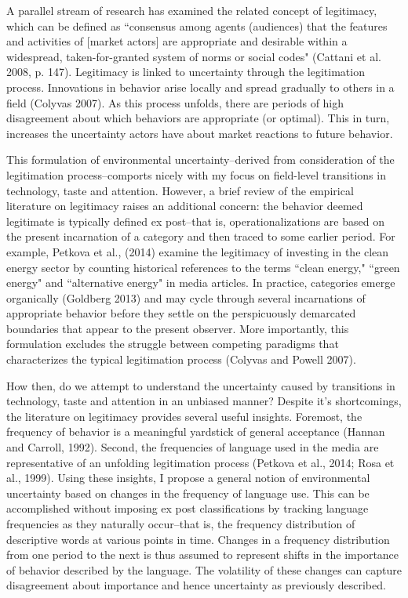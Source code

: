 A parallel stream of research has examined the related concept of legitimacy, which can be defined as ``consensus among agents (audiences) that the features and activities of [market actors] are appropriate and desirable within a widespread, taken-for-granted system of norms or social codes" (Cattani et al. 2008, p. 147). Legitimacy is linked to uncertainty through the legitimation process. Innovations in behavior arise locally and spread gradually to others in a field (Colyvas 2007). As this process unfolds, there are periods of high disagreement about which behaviors are appropriate (or optimal). This in turn, increases the uncertainty actors have about market reactions to future behavior.

This formulation of environmental uncertainty--derived from consideration of the legitimation process--comports nicely with my focus on field-level transitions in technology, taste and attention. However, a brief review of the empirical literature on legitimacy raises an additional concern: the behavior deemed legitimate is typically defined ex post--that is, operationalizations are based on the present incarnation of a category and then traced to some earlier period. For example, Petkova et al., (2014) examine the legitimacy of investing in the clean energy sector by counting historical references to the terms ``clean energy," ``green energy" and ``alternative energy" in media articles. In practice, categories emerge organically (Goldberg 2013) and may cycle through several incarnations of appropriate behavior before they settle on the perspicuously demarcated boundaries that appear to the present observer. More importantly, this formulation excludes the struggle between competing paradigms that characterizes the typical legitimation process (Colyvas and Powell 2007).

How then, do we attempt to understand the uncertainty caused by transitions in technology, taste and attention in an unbiased manner? Despite it's shortcomings, the literature on legitimacy provides several useful insights. Foremost, the frequency of  behavior is a meaningful yardstick of general acceptance (Hannan and Carroll, 1992). Second, the frequencies of language used in the media are representative of an unfolding legitimation process (Petkova et al., 2014; Rosa et al., 1999). Using these insights, I propose a general notion of environmental uncertainty based on changes in the frequency of language use. This can be accomplished without imposing ex post classifications by tracking language frequencies as they naturally occur--that is, the frequency distribution of descriptive words at various points in time. Changes in a frequency distribution from one period to the next is thus assumed to represent shifts in the importance of behavior described by the language. The volatility of these changes can capture disagreement about importance and hence uncertainty as previously described. 

